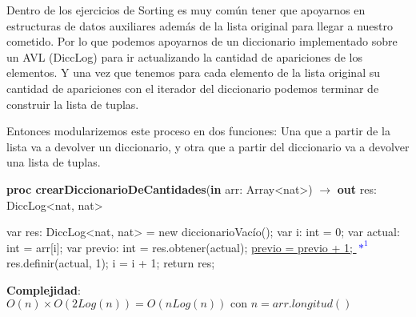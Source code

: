 \documentclass{article}
\newcommand{\Complexity}[1]{\textbf{Complejidad}: #1}
\begin{document}
Dentro de los ejercicios de Sorting es muy común tener que apoyarnos en estructuras de datos auxiliares además de la lista original para llegar a nuestro cometido. Por lo que podemos apoyarnos de un diccionario implementado sobre un AVL (DiccLog) para ir actualizando la cantidad de apariciones de los elementos. Y una vez que tenemos para cada elemento de la lista original su cantidad de apariciones con el iterador del diccionario podemos terminar de construir la lista de tuplas.

Entonces modularizemos este proceso en dos funciones: Una que a partir de la lista va a devolver un diccionario, y otra que a partir del diccionario va a devolver una lista de tuplas. 
\begin{algorithm}[H]
    \caption{
        \textbf{proc crearDiccionarioDeCantidades}(\textbf{in} arr: \textnormal{Array\textless{}nat\textgreater{}}) $\to$ \textbf{out} res:  \textnormal{DiccLog\textless{}nat, nat\textgreater{}}
    }
    \begin{algorithmic}[1]
        \State var res: \textnormal{DiccLog\textless{}nat, nat\textgreater{}} = new diccionarioVacío();  
        \State var i: int = 0;
         
            \State var actual: int = arr[i]; 
             
                \State var previo: int = res.obtener(actual); 
                \State \hyperref[sec:explanation1]{previo = previo + 1; \textcolor{blue}{$*^{1}$}}
            \Else
                \State res.definir(actual, 1); 
            \EndIf 
            \State i = i + 1;
        \EndWhile
    \State return res;
    \end{algorithmic}
    \Complexity{$O(n) \times O(2Log(n)) = O(nLog(n)) \text{ con } n = arr.longitud()$ }
\end{algorithm}
\end{document}
